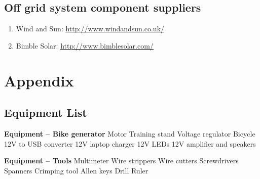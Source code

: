 \documentclass{article}
\theoremstyle{definition}
\theoremstyle{definition}
\theoremstyle{remark}
\begin{document}

  \subsection{Off grid system component suppliers} %
  \label{sub:off_grid_system_component_suppliers}

    \begin{enumerate}[resume]
      \item Wind and Sun: \href{http://www.windandsun.co.uk/}{\underline{http://www.windandsun.co.uk/}}
      \item Bimble Solar: \href{http://www.bimblesolar.com/}{\underline{http://www.bimblesolar.com/}}
    \end{enumerate}
  


\newpage

\section{Appendix} %
\label{sec:appendix}

  \subsection{Equipment List} %
  \label{sub:equipment_list}

    \textbf{Equipment – Bike generator}
    Motor \newline
    Training stand \newline
    Voltage regulator \newline
    Bicycle \newline
    12V to USB converter \newline
    12V laptop charger \newline
    12V LEDs \newline
    12V amplifier and speakers

    \textbf{Equipment – Tools} \newline
    Multimeter \newline
    Wire strippers \newline
    Wire cutters \newline
    Screwdrivers \newline
    Spanners \newline
    Crimping tool \newline
    Allen keys \newline
    Drill \newline
    Ruler
\end{document}

